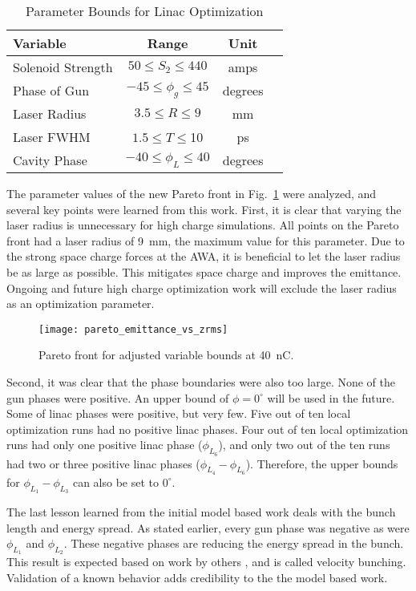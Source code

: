 \documentclass[letterpaper,  %
              ]{jacow-2_3}   %
\newcommand{\lsnote}[1]{\textsf{{\color{violet}{ LS note:}   #1 }}}
\begin{document}
\begin{table}[hbt] 
	\centering
	\caption{Parameter Bounds for Linac Optimization}
	\begin{tabular}{ l *{3}{c}}
		\toprule
		\textbf{Variable} & \textbf{Range} & \textbf{Unit} \\
		\midrule
		Solenoid Strength & $ 50 \le S_2 \le 440$  & amps \\
		Phase of Gun & $-45 \le \phi_g \le 45$  & degrees \\
		Laser Radius  & $3.5 \le R \le 9$  & mm \\
		Laser FWHM & $1.5 \le T \le $10  & ps \\
		Cavity Phase & $-40 \le \phi_L \le 40$  & degrees \\
		\bottomrule	
	\end{tabular}	
	\label{bounds}
\end{table}

The parameter values of the new Pareto front in Fig.~\ref{paretob} were analyzed, and 
several key points were learned from this work. 
First, it is clear that varying the laser radius is unnecessary for 
high charge simulations. All points on the Pareto front
had a laser radius of \SI{9}{mm}, the maximum value for this parameter.
Due to the strong space charge forces at the AWA, 
it is beneficial to let the 
laser radius be as large as possible.  This mitigates space charge
and improves the emittance. Ongoing and future high charge optimization 
work will exclude the laser radius as an optimization parameter.
\begin{figure}
	\texttt{[image: pareto\_emittance\_vs\_zrms]}
	\caption{Pareto front for adjusted variable bounds at \SI{40}{nC}. }
	\label{paretob}
\end{figure}

Second, it was clear that the phase boundaries were also too large.
None of the gun phases were positive. An upper bound of $\phi = 0^{\circ}$
will be used in the future. Some of linac phases were positive, 
but very few. Five out of ten local optimization runs had no positive linac 
phases. Four out of ten local optimization runs had only one positive 
linac \lsnote{phase} ($\phi_{L_6}$), and only two out of the ten runs had two or three
positive linac phases ($\phi_{L_4}-\phi_{L_6}$). Therefore, the upper bounds for 
$\phi_{L_1}-\phi_{L_3}$ can also be set to $0^{\circ}$. 

The last lesson learned from the initial model based work deals with the bunch length
and energy spread. As stated earlier, every gun phase was negative as were 
$\phi_{L_1}$ and $\phi_{L_2}$. These negative phases are reducing the 
energy spread in the bunch. This result is expected based on work by others \cite{lclsii}, 
and is called velocity bunching. Validation of a known behavior adds 
credibility to the the model based work.
\end{document}
